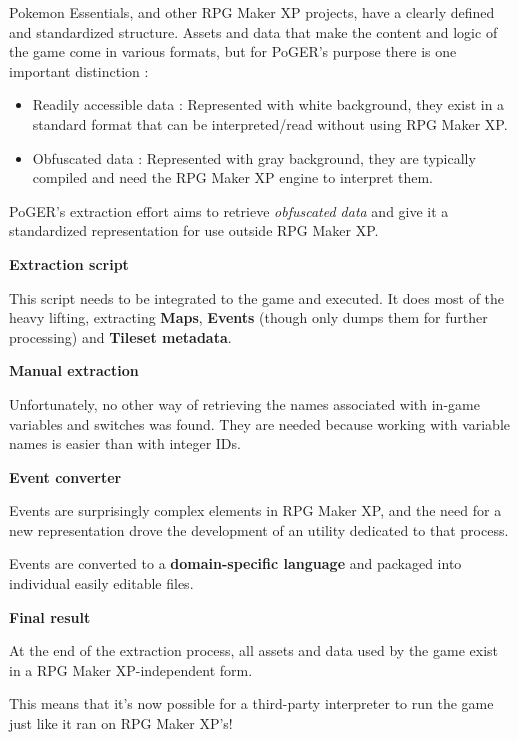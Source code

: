 \documentclass[11pt]{article}
\begin{document}
{Pokemon Essentials, and other RPG Maker XP projects, have a clearly defined and standardized structure. Assets and data that make the content and logic of the game come in various formats, but for PoGER's purpose there is one important distinction :

\begin{itemize}
	\item Readily accessible data : Represented with white background, they exist in a standard format that can be interpreted/read without using RPG Maker XP.
	
	\item Obfuscated data : Represented with gray background, they are typically compiled and need the RPG Maker XP engine to interpret them.
\end{itemize}

PoGER's extraction effort aims to retrieve \textit{obfuscated data} and give it a standardized representation for use outside RPG Maker XP.

\vspace{2mm}
\textbf{Extraction script}

This script needs to be integrated to the game and executed. It does most of the heavy lifting, extracting \textbf{Maps}, \textbf{Events} (though only dumps them for further processing) and \textbf{Tileset metadata}.

\vspace{2mm}
\textbf{Manual extraction}

Unfortunately, no other way of retrieving the names associated with in-game variables and switches was found. They are needed because working with variable names is easier than with integer IDs.

\vspace{2mm}
\textbf{Event converter}

Events are surprisingly complex elements in RPG Maker XP, and the need for a new representation drove the development of an utility dedicated to that process.

Events are converted to a \textbf{domain-specific language} and packaged into individual easily editable files.

\vspace{2mm}
\textbf{Final result}

At the end of the extraction process, all assets and data used by the game exist in a RPG Maker XP-independent form.

This means that it's now possible for a third-party interpreter to run the game just like it ran on RPG Maker XP's!

}
\end{document}
